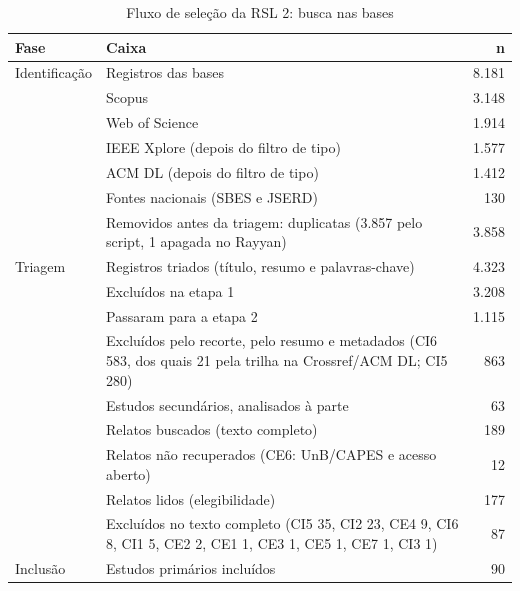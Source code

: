 \begin{table}[htbp]
\centering
\caption{Fluxo de seleção da RSL 2: busca nas bases}
\label{tab:prisma-rsl2}
\small
\begin{tabular}{p{2.2cm}p{9.5cm}r}
\hline
\textbf{Fase} & \textbf{Caixa} & \textbf{n} \\
\hline
Identificação & Registros das bases & 8.181 \\
 & Scopus & 3.148 \\
 & Web of Science & 1.914 \\
 & IEEE Xplore (depois do filtro de tipo) & 1.577 \\
 & ACM DL (depois do filtro de tipo) & 1.412 \\
 & Fontes nacionais (SBES e JSERD) & 130 \\
 & Removidos antes da triagem: duplicatas (3.857 pelo script, 1 apagada no Rayyan) & 3.858 \\
Triagem & Registros triados (título, resumo e palavras-chave) & 4.323 \\
 & Excluídos na etapa 1 & 3.208 \\
 & Passaram para a etapa 2 & 1.115 \\
 & Excluídos pelo recorte, pelo resumo e metadados (CI6 583, dos quais 21 pela trilha na Crossref/ACM DL; CI5 280) & 863 \\
 & Estudos secundários, analisados à parte & 63 \\
 & Relatos buscados (texto completo) & 189 \\
 & Relatos não recuperados (CE6: UnB/CAPES e acesso aberto) & 12 \\
 & Relatos lidos (elegibilidade) & 177 \\
 & Excluídos no texto completo (CI5 35, CI2 23, CE4 9, CI6 8, CI1 5, CE2 2, CE1 1, CE3 1, CE5 1, CE7 1, CI3 1) & 87 \\
Inclusão & Estudos primários incluídos & 90 \\
\hline
\end{tabular}
\end{table}
